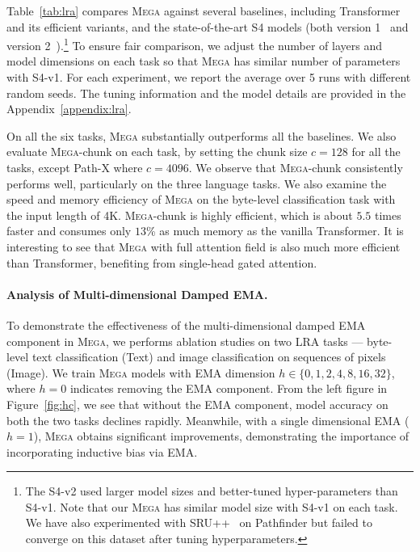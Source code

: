 Table~\ref{tab:lra} compares \textsc{Mega} against several baselines, including Transformer and its efficient variants, and the state-of-the-art S4 models (both version 1~\citep{gu2022efficiently} and version 2~\citep{gu2022parameterization}).\footnote{The S4-v2 used larger model sizes and better-tuned hyper-parameters than S4-v1. Note that our \textsc{Mega} has similar model size with S4-v1 on each task. We have also experimented with SRU++~\citep{lei2021attention} on Pathfinder but failed to converge on this dataset after tuning hyperparameters.} To ensure fair comparison, we adjust the number of layers and model dimensions on each task so that \textsc{Mega} has similar number of parameters with S4-v1. For each experiment, we report the average over 5 runs with different random seeds. The tuning information and the model details are provided in the Appendix~\ref{appendix:lra}.

On all the six tasks, \textsc{Mega} substantially outperforms all the baselines. We also evaluate \textsc{Mega}-chunk on each task, by setting the chunk size $c=128$ for all the tasks, except Path-X where $c=4096$. We observe that \textsc{Mega}-chunk consistently performs well, particularly on the three language tasks. We also examine the speed and memory efficiency of \textsc{Mega} on the byte-level classification task with the input length of 4K.
\textsc{Mega}-chunk is highly efficient, which is about $5.5$ times faster and consumes only $13$\% as much memory as the vanilla Transformer. It is interesting to see that \textsc{Mega} with full attention field is also much more efficient than Transformer, benefiting from single-head gated attention.

\paragraph{Analysis of Multi-dimensional Damped EMA.} To demonstrate the effectiveness of the multi-dimensional damped EMA component in \textsc{Mega}, we performs ablation studies on two LRA tasks --- byte-level text classification (Text) and image classification on sequences of pixels (Image). We train \textsc{Mega} models with EMA dimension $h \in \{0, 1, 2, 4, 8, 16, 32\}$, where $h=0$ indicates removing the EMA component. From the left figure in Figure~\ref{fig:hc}, we see that without the EMA component, model accuracy on both the two tasks declines rapidly. Meanwhile, with a single dimensional EMA ($h=1$), \textsc{Mega} obtains significant improvements, demonstrating the importance of incorporating inductive bias via EMA.


